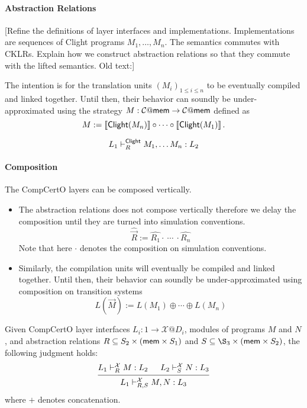 \documentclass[acmsmall,review,anonymous]{acmart}\settopmatter{printfolios=true,printccs=false,printacmref=false}
\begin{document}

\paragraph{Abstraction Relations} %

[Refine the definitions of layer interfaces and implementations.
Implementations are sequences of Clight programs $M_1, \ldots, M_n$.
The semantics commutes with CKLRs.
Explain how we construct abstraction relations
so that they commute with the lifted semantics.
Old text:]

The intention is for the translation units $(M_i)_{1 \le i \le n}$
to be eventually compiled and linked together.
Until then,
their behavior can soundly be under-approximated
using the strategy
$M : \mathcal{C}@ \mathsf{mem}  \rightarrow \mathcal{C}@ \mathsf{mem} $
defined as
\[
  M := \llbracket  \mathsf{Clight} (M_n) \rrbracket \circ \cdots \circ
       \llbracket  \mathsf{Clight} (M_1) \rrbracket
  \,.
\]

\[
  L_1 \vdash^{ \mathsf{Clight} }_R M_1, \ldots M_n : L_2
\]

\paragraph{Composition} The CompCertO layers can be composed vertically.

\begin{itemize}
\item The abstraction relations does not compose vertically therefore we delay
  the composition until they are turned into simulation conventions.
  \[
    \hat{\vec{R}} := \hat{R_1} \cdot\ \cdots\ \cdot \hat{R_n}
  \]
  Note that here $\cdot$ denotes the composition on simulation conventions.
\item Similarly, the compilation units will eventually be compiled and linked
  together. Until then, their behavior can soundly be under-approximated using
  composition on transition systems
  \[
    L(\vec{M}) := L(M_1) \oplus \cdots \oplus L(M_n)
  \]
\end{itemize}

\begin{lemma}
  Given CompCertO layer interfaces
  $L_i : 1 \rightarrow \mathcal{X}@D_i$, modules of programs
  $M$ and $N$, and abstraction relations
  $R\subseteq S_2 \times ( \mathsf{mem}  \times S_1)$ and
  $S\subseteq \S_3 \times (\kw{mem} \times S_2)$, the following judgment holds:
  \[
    \begin{prooftree}
      \hypo{L_1 \vdash^\mathcal{X}_R M : L_2}
      \hypo{L_2 \vdash^\mathcal{X}_S N : L_3}
      \infer2{L_1 \vdash^\mathcal{X}_{R,S} M,N : L_3}
    \end{prooftree}
  \]
  where $+$ denotes concatenation.
\end{lemma}
\end{document}
